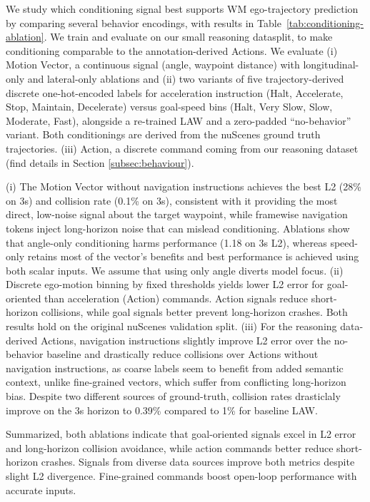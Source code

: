 \documentclass[letterpaper, 10 pt, conference]{ieeeconf}
\begin{document}
We study which conditioning signal best supports WM ego-trajectory prediction by comparing several behavior encodings, with results in Table~\ref{tab:conditioning-ablation}. We train and evaluate on our small reasoning datasplit, to make conditioning comparable to the annotation-derived Actions. 
We evaluate (i) Motion Vector, a continuous signal (angle, waypoint distance) with longitudinal-only and lateral-only ablations and (ii) two variants of five trajectory-derived discrete one-hot-encoded labels for acceleration instruction (Halt, Accelerate, Stop, Maintain, Decelerate) versus goal-speed bins (Halt, Very Slow, Slow, Moderate, Fast), alongside a re-trained LAW and a zero-padded “no-behavior” variant. Both conditionings are derived from the nuScenes ground truth trajectories. (iii) Action, a discrete command coming from our reasoning dataset (find details in Section \ref{subsec:behaviour}).

(i) The Motion Vector without navigation instructions achieves the best L2 (28\% on 3s) and collision rate (0.1\% on 3s), consistent with it providing the most direct, low-noise signal about the target waypoint, while framewise navigation tokens inject long-horizon noise that can mislead conditioning. Ablations show that angle-only conditioning harms performance (1.18 on 3s L2), whereas speed-only retains most of the vector’s benefits and best performance is achieved using both scalar inputs. We assume that using only angle diverts model focus.
(ii) Discrete ego-motion binning by fixed thresholds yields lower L2 error for goal-oriented than acceleration (Action) commands. Action signals reduce short-horizon collisions, while goal signals better prevent long-horizon crashes. 
Both results hold on the original nuScenes validation split.
(iii) For the reasoning data-derived Actions, navigation instructions slightly improve L2 error over the no-behavior baseline and drastically reduce collisions over Actions without navigation instructions, as coarse labels seem to benefit from added semantic context, unlike fine-grained vectors, which suffer from conflicting long-horizon bias. Despite two different sources of ground-truth, collision rates drasticlaly improve on the 3s horizon to 0.39\% compared to 1\% for baseline LAW.

Summarized, both ablations indicate that goal-oriented signals excel in L2 error and long-horizon collision avoidance, while action commands better reduce short-horizon crashes. Signals from diverse data sources improve both metrics despite slight L2 divergence. Fine-grained commands boost open-loop performance with accurate inputs.
\end{document}
